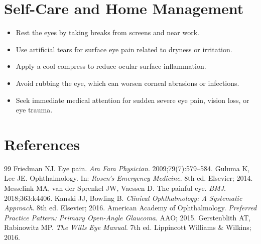 \section*{Self-Care and Home Management}
\begin{itemize}
  \item Rest the eyes by taking breaks from screens and near work.
  \item Use artificial tears for surface eye pain related to dryness or irritation.
  \item Apply a cool compress to reduce ocular surface inflammation.
  \item Avoid rubbing the eye, which can worsen corneal abrasions or infections.
  \item Seek immediate medical attention for sudden severe eye pain, vision loss, or eye trauma.
\end{itemize}

\section*{References}
\begin{thebibliography}{99}
Friedman NJ. Eye pain. \textit{Am Fam Physician}. 2009;79(7):579--584.
Guluma K, Lee JE. Ophthalmology. In: \textit{Rosen's Emergency Medicine}. 8th ed. Elsevier; 2014.
Messelink MA, van der Sprenkel JW, Vaessen D. The painful eye. \textit{BMJ}. 2018;363:k4406.
Kanski JJ, Bowling B. \textit{Clinical Ophthalmology: A Systematic Approach}. 8th ed. Elsevier; 2016.
American Academy of Ophthalmology. \textit{Preferred Practice Pattern: Primary Open-Angle Glaucoma}. AAO; 2015.
Gerstenblith AT, Rabinowitz MP. \textit{The Wills Eye Manual}. 7th ed. Lippincott Williams \& Wilkins; 2016.
\end{thebibliography}
